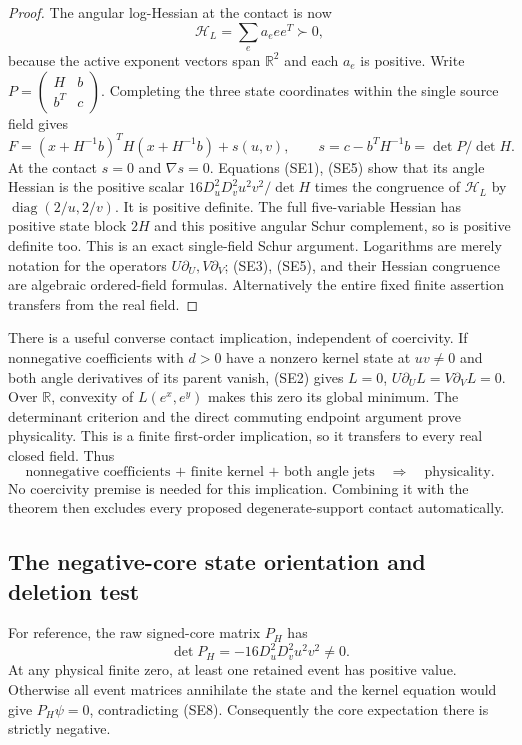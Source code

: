 \begin{proof}
The angular log-Hessian at the contact is now
\[
\mathcal H_L=\sum_ea_e ee^T\succ0,
\tag{SE5}
\]
because the active exponent vectors span $\mathbb R^2$ and each
$a_e$ is positive.  Write
$P=\left(\begin{smallmatrix}H&b\\b^T&c\end{smallmatrix}\right)$.
Completing the three state coordinates within the single source field
gives
\[
F=(x+H^{-1}b)^TH(x+H^{-1}b)+s(u,v),\qquad
s=c-b^TH^{-1}b=\det P/\det H.
\tag{SE6}
\]
At the contact $s=0$ and $\nabla s=0$.  Equations (SE1), (SE5)
show that its angle Hessian is the positive scalar
$16D_u^2D_v^2u^2v^2/\det H$ times the congruence of
$\mathcal H_L$ by $\operatorname{diag}(2/u,2/v)$.
It is positive definite.  The full five-variable Hessian has positive
state block $2H$ and this positive angular Schur complement, so is
positive definite too.  This is an exact single-field Schur argument.
Logarithms are merely notation for the operators
$U\partial_U,V\partial_V$; (SE3), (SE5), and their Hessian
congruence are algebraic ordered-field formulas.  Alternatively the
entire fixed finite assertion transfers from the real field.
\end{proof}

There is a useful converse contact implication, independent of
coercivity.  If nonnegative coefficients with $d>0$ have a nonzero
kernel state at $uv\ne0$ and both angle derivatives of its parent
vanish, (SE2) gives $L=0$, $U\partial_UL=V\partial_VL=0$.
Over $\mathbb R$, convexity of $L(e^x,e^y)$ makes this zero its
global minimum.  The determinant criterion and the direct commuting
endpoint argument prove physicality.  This is a finite first-order
implication, so it transfers to every real closed field.  Thus
\[
\text{nonnegative coefficients + finite kernel + both angle jets}
 \quad\Longrightarrow\quad\text{physicality}.
\tag{SE7}
\]
No coercivity premise is needed for this implication.  Combining it
with the theorem then excludes every proposed degenerate-support
contact automatically.

\subsection{The negative-core state orientation and deletion test}

For reference, the raw signed-core matrix $P_H$ has
\[
\det P_H=-16D_u^2D_v^2u^2v^2\ne0.
\tag{SE8}
\]
At any physical finite zero, at least one retained event has positive
value.  Otherwise all event matrices annihilate the state and the
kernel equation would give $P_H\psi=0$, contradicting (SE8).
Consequently the core expectation there is strictly negative.

